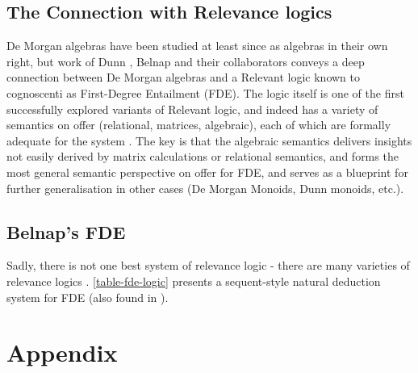\documentclass[11pt,a4paper]{article}
\theoremstyle{definition}
\begin{document}
\subsection{The Connection with Relevance logics}
De Morgan algebras have been studied at least since \cite{10.2307/1993112} as algebras in their own right, but work of Dunn \cite{Dunn1999}, Belnap \cite{Belnap1977} and their collaborators \cite{anderson2017entailment} conveys a deep connection between De Morgan algebras and a Relevant logic known to cognoscenti as First-Degree Entailment (FDE). The logic itself is one of the first successfully explored variants of Relevant logic, and indeed has a variety of semantics on offer (relational, matrices, algebraic), each of which are formally adequate for the system \cite{omori201740}. The key is that the algebraic semantics delivers insights not easily derived by matrix calculations or relational semantics, and forms the most general semantic perspective on offer for FDE, and serves as a blueprint for further generalisation in other cases (De Morgan Monoids, Dunn monoids, etc.). 
\subsection{Belnap's FDE}
\par Sadly, there is not one best system of relevance logic - there are many varieties of relevance logics \cite{anderson2017entailment}. \ref{table-fde-logic} presents a sequent-style natural deduction system for FDE (also found in \cite{omori201740}).
\fi







 

\appendix

\section{Appendix}
\label{sec:appendix}
\end{document}

